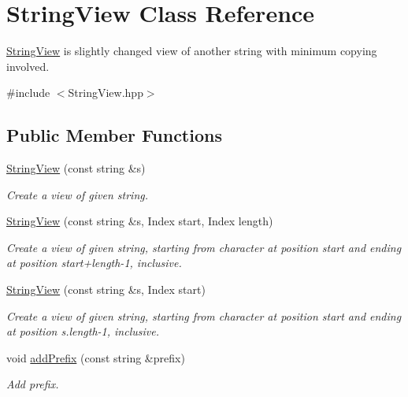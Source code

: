 \hypertarget{class_string_view}{\section{\-String\-View \-Class \-Reference}
\label{class_string_view}
}


\hyperlink{class_string_view}{\-String\-View} is slightly changed view of another string with minimum copying involved.  




{\ttfamily \#include $<$\-String\-View.\-hpp$>$}

\subsection*{\-Public \-Member \-Functions}
\begin{DoxyCompactItemize}
\item 
\hyperlink{class_string_view_a522ccbcc302cd1abd01d680cac12ab8e}{\-String\-View} (const string \&s)
\begin{DoxyCompactList}\small\item\em \-Create a view of given string. \end{DoxyCompactList}\item 
\hyperlink{class_string_view_aa931db04bde219d3ab4352bd4e7152f1}{\-String\-View} (const string \&s, \-Index start, \-Index length)
\begin{DoxyCompactList}\small\item\em \-Create a view of given string, starting from character at position start and ending at position start+length-\/1, inclusive. \end{DoxyCompactList}\item 
\hyperlink{class_string_view_ae455a514d2b78e5f8922761aab432bce}{\-String\-View} (const string \&s, \-Index start)
\begin{DoxyCompactList}\small\item\em \-Create a view of given string, starting from character at position start and ending at position s.\-length-\/1, inclusive. \end{DoxyCompactList}\item 
void \hyperlink{class_string_view_af1005934a166e1a3939f48835a3b6533}{add\-Prefix} (const string \&prefix)
\begin{DoxyCompactList}\small\item\em \-Add prefix. \end{DoxyCompactList}\item 

\end{DoxyCompactItemize}
